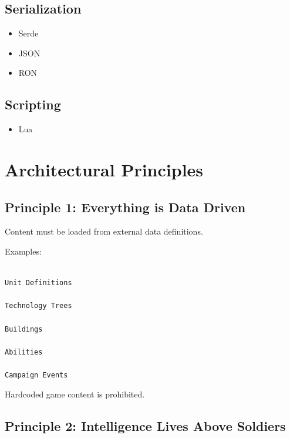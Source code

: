 \documentclass[11pt,a4paper]{article}
\begin{document}
\subsection{Serialization}

\begin{itemize}

    \item Serde

    \item JSON

    \item RON

\end{itemize}

\subsection{Scripting}

\begin{itemize}

    \item Lua

\end{itemize}

\section{Architectural Principles}

\subsection{Principle 1: Everything is Data Driven}

Content must be loaded from external data definitions.

Examples:

\begin{verbatim}

Unit Definitions

Technology Trees

Buildings

Abilities

Campaign Events

\end{verbatim}

Hardcoded game content is prohibited.

\subsection{Principle 2: Intelligence Lives Above Soldiers}
\end{document}

